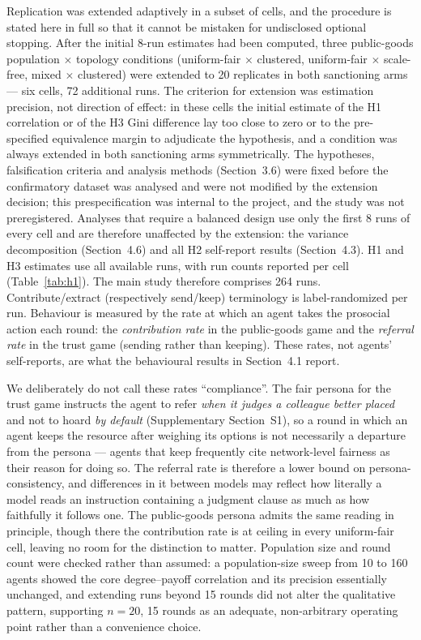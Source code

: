 \documentclass[11pt,a4paper]{article}
\begin{document}
Replication was extended adaptively in a subset of cells, and the
procedure is stated here in full so that it cannot be mistaken for
undisclosed optional stopping. After the initial 8-run estimates had
been computed, three public-goods population $\times$ topology
conditions (uniform-fair $\times$ clustered, uniform-fair $\times$
scale-free, mixed $\times$ clustered) were extended to 20 replicates
in both sanctioning arms --- six cells, 72 additional runs. The
criterion for extension was estimation precision, not direction of
effect: in these cells the initial estimate of the H1 correlation or
of the H3 Gini difference lay too close to zero or to the
pre-specified equivalence margin to adjudicate the hypothesis, and a
condition was always extended in both sanctioning arms symmetrically.
The hypotheses, falsification criteria and analysis methods
(Section~3.6) were fixed before the confirmatory dataset was analysed
and were not modified by the extension decision; this prespecification
was internal to the project, and the study was not preregistered.
Analyses that require a balanced design use only the first 8 runs of
every cell and are therefore unaffected by the extension: the variance
decomposition (Section~4.6) and all H2 self-report results
(Section~4.3). H1 and H3 estimates use all available runs, with run
counts reported per cell (Table~\ref{tab:h1}). The main study
therefore comprises 264 runs.
Contribute/extract (respectively send/keep) terminology is
label-randomized per run.
Behaviour is measured by the rate at which an agent takes the
prosocial action each round: the \emph{contribution rate} in the
public-goods game and the \emph{referral rate} in the trust game
(sending rather than keeping). These rates, not agents' self-reports,
are what the behavioural results in Section~4.1 report.

We deliberately do not call these rates ``compliance''. The fair
persona for the trust game instructs the agent to refer \emph{when it
judges a colleague better placed} and not to hoard \emph{by default}
(Supplementary Section~S1), so a round in which an agent keeps the
resource after weighing its options is not necessarily a departure
from the persona --- agents that keep frequently cite network-level
fairness as their reason for doing so. The referral rate is therefore
a lower bound on persona-consistency, and differences in it between
models may reflect how literally a model reads an instruction
containing a judgment clause as much as how faithfully it follows one.
The public-goods persona admits the same reading in principle, though
there the contribution rate is at ceiling in every uniform-fair cell,
leaving no room for the distinction to matter. Population size and round count were checked rather than
assumed: a population-size sweep from 10 to 160 agents showed the
core degree--payoff correlation and its precision essentially
unchanged, and extending runs beyond 15 rounds did not alter the
qualitative pattern, supporting $n=20$, 15 rounds as an adequate,
non-arbitrary operating point rather than a convenience choice.
\end{document}

